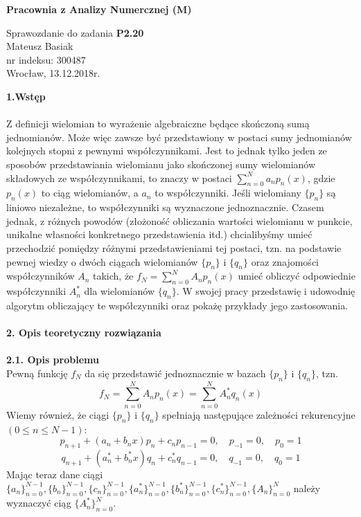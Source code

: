 \documentclass[a4paper]{article}
\begin{document}
\begin{center}
\LARGE
\textbf{Pracownia z Analizy Numercznej (M)}\\
\end{center}
\begin{center}
\Large
Sprawozdanie do zadania \textbf{P2.20}\\
Mateusz Basiak\\
nr indeksu: 300487\\
Wrocław, 13.12.2018r.\\
\end{center}
\Large
\textbf{1.Wstęp}\\\\
\normalsize
Z definicji\cite{WI} wielomian to wyrażenie algebraiczne będące skończoną sumą jednomianów. Może więc zawsze być przedstawiony w postaci sumy jednomianów kolejnych stopni z pewnymi współczynnikami. Jest to jednak tylko jeden ze sposobów przedstawiania wielomianu jako skończonej sumy wielomianów składowych ze współczynnikami, to znaczy w postaci $\sum_{n=0}^{N} a_n p_n(x)$, gdzie $p_n(x)$ to ciąg wielomianów, a $a_n$ to współczynniki. Jeśli wielomiany $\{p_n\}$ są liniowo niezależne, to współczynniki są wyznaczone jednoznacznie. Czasem jednak, z różnych powodów (złożoność obliczania wartości wielomianu w punkcie, unikalne własności konkretnego przedstawienia itd.) chcialibyśmy umieć przechodzić pomiędzy różnymi przedstawieniami tej postaci, tzn. na podstawie pewnej wiedzy o dwóch ciągach wielomianów $\{p_n\}$ i $\{q_n\}$ oraz znajomości współczynników $A_n$ takich, że $f_N = \sum_{n=0}^{N} A_n p_n(x)$ umieć obliczyć odpowiednie współczynniki $A_n^*$ dla wielomianów $\{q_n\}$. W swojej pracy przedstawię i udowodnię algorytm obliczający te współczynniki oraz pokażę przykłady jego zastosowania.\\\\

\Large
\textbf{2. Opis teoretyczny rozwiązania}\\\\
\large
\textbf{2.1. Opis problemu}\\
\normalsize
Pewną funkcję $f_N$ da się przedstawić jednoznacznie w bazach $\{p_n\}$ i $\{q_n\}$, tzn. \\
\begin{equation}\label{teza}
f_N = \sum_{n=0}^{N} A_n p_n(x) = \sum_{n=0}^{N} A_n^* q_n(x)
\end{equation}
Wiemy również, że ciągi $\{p_n\}$ i $\{q_n\}$ spełniają następujące zależności rekurencyjne $(0 \leq n \leq N-1)$:
\begin{equation}\label{rekursjap}
p_{n+1} + (a_n + b_nx)p_n + c_np_{n-1} = 0, \quad p_{-1} = 0, \quad p_0 = 1
\end{equation}
\begin{equation}\label{rekursjaq}
q_{n+1} + (a_n^* + b_n^*x)q_n + c_n^*q_{n-1} = 0, \quad q_{-1} = 0, \quad q_0 = 1
\end{equation}
Mając teraz dane ciągi $\{a_n\}_{n=0}^{N-1}, \{b_n\}_{n=0}^{N-1}, \{c_n\}_{n=0}^{N-1}, \{a_n^*\}_{n=0}^{N-1}, \{b_n^*\}_{n=0}^{N-1}, \{c_n^*\}_{n=0}^{N-1}, \{A_n\}_{n=0}^N$ należy wyznaczyć ciąg $\{A_n^*\}_{n=0}^N$.\\\\
\end{document}
